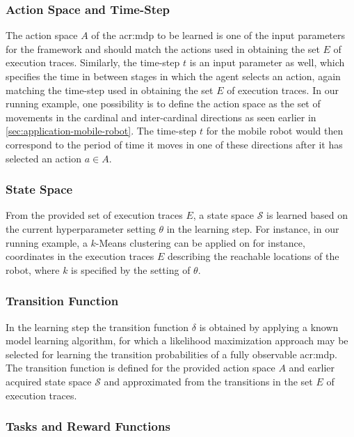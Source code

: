 \subsubsection{Action Space and Time-Step}
The action space $A$ of the \acrshort{acr:mdp} to be learned is one of the input parameters for the framework and should match the actions used in obtaining the set $E$ of execution traces.
Similarly, the time-step $t$ is an input parameter as well, which specifies the time in between stages in which the agent selects an action, again matching the time-step used in obtaining the set $E$ of execution traces.
In our running example, one possibility is to define the action space as the set of movements in the cardinal and inter-cardinal directions as seen earlier in \autoref{sec:application-mobile-robot}.
The time-step $t$ for the mobile robot would then correspond to the period of time it moves in one of these directions after it has selected an action $a \in A$.

\subsubsection{State Space}
From the provided set of execution traces $E$, a state space $\mathcal{S}$ is learned based on the current hyperparameter setting $\theta$ in the learning step.
For instance, in our running example, a $k$-Means clustering can be applied on for instance, coordinates in the execution traces $E$ describing the reachable locations of the robot, where $k$ is specified by the setting of $\theta$.

\subsubsection{Transition Function}
In the learning step the transition function $\delta$ is obtained by applying a known model learning algorithm, for which a likelihood maximization approach may be selected for learning the transition probabilities of a fully observable \acrshort{acr:mdp}.
The transition function is defined for the provided action space $A$ and earlier acquired state space $\mathcal{S}$ and approximated from the transitions in the set $E$ of execution traces.

\subsubsection{Tasks and Reward Functions}

